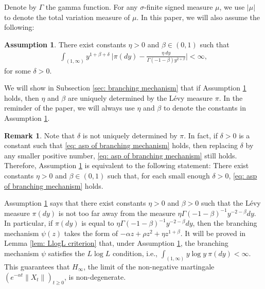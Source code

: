 \documentclass[12pt,a4paper]{amsart}
\theoremstyle{plain}
\theoremstyle{definition}
\newtheorem{rem}[thm]{Remark}
\newtheorem{asp}{Assumption}
\numberwithin{equation}{section}
\begin{document}
Denote by $\Gamma$ the gamma function.
For any $\sigma$-finite signed measure $\mu$, we use $|\mu|$ to denote the total variation measure of $\mu$.
In this paper, we will also assume the following:
\begin{asp}
  \label{asp: branching mechanism}
  There exist constants $\eta > 0$ and $\beta \in (0,1)$ such that
  \begin{align}
    \label{eq: asp of branching mechanism}
    \int_{(1,\infty)}y^{1+\beta +\delta}~\Big|\pi(dy)-\frac{\eta~dy}{\Gamma(-1-\beta)y^{2+\beta}}\Big| <\infty,
  \end{align}
	for some $\delta > 0$.
\end{asp}
We will show in Subsection \ref{sec: branching mechanism} that if Assumption \ref{asp: branching mechanism} holds, then $\eta$ and $\beta$ are uniquely determined by the L\'evy measure $\pi$.
In the reminder of the paper, we will always use $\eta$ and $\beta$ to denote the constants in Assumption  \ref{asp: branching mechanism}.

\begin{rem}
  \label{rem: small enough delta}
	Note that $\delta$ is not uniquely determined by $\pi$.
	In fact, if $\delta>0$ is a constant such that \eqref{eq: asp of branching mechanism} holds, then replacing $\delta$ by any smaller positive number, \eqref{eq: asp of branching mechanism} still holds.
	Therefore, Assumption \ref{asp: branching mechanism} is equivalent to the following statement: 
	There exist constants $\eta > 0$ and $\beta \in (0,1)$ such that, for each small enough $\delta>0$, \eqref{eq: asp of branching mechanism} holds.
\end{rem}

Assumption \ref{asp: branching mechanism} says that there exist constants $\eta>0$ and $\beta > 0$ such that the L\'evy measure $\pi(dy)$ is not too far away from the measure $\eta \Gamma(-1-\beta)^{-1}y^{-2-\beta} dy$.
In particular, if $\pi(dy)$ is equal to $\eta \Gamma(-1-\beta)^{-1}y^{-2-\beta} dy$, then the branching mechanism $\psi(z)$ takes the form of $-\alpha z + \rho z^2 + \eta z^{1+\beta}$.
It will be proved in Lemma \ref{lem: LlogL criterion} that, under Assumption \ref{asp: branching mechanism}, the branching mechanism $\psi$ satisfies the $L \log L$ condition, i.e.,
$
\int_{(1,\infty)} y\log y~\pi(dy) < \infty.
$
This guarantees that $H_\infty$, the limit of the non-negative martingale $(e^{-\alpha t} \|X_t\|)_{t\geq 0}$, is non-degenerate.
\end{document}
